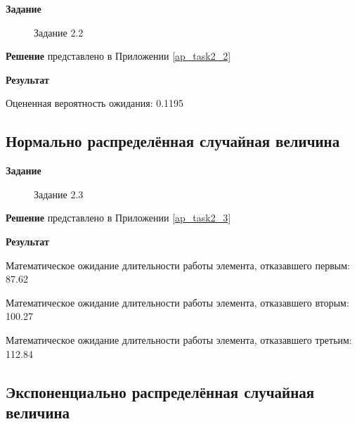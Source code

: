 \documentclass[otchet]{SCWorks}
\begin{document}
\textbf{Задание}

\begin{figure}[H]
	\caption{Задание 2.2}
	\label{pic4}
\end{figure}

\textbf{Решение} представлено в Приложении \ref{ap_task2_2}

\textbf{Результат} 

Оцененная вероятность ожидания: 0.1195

\subsection{Нормально распределённая случайная величина}

\textbf{Задание}

\begin{figure}[H]
	\caption{Задание 2.3}
	\label{pic5}
\end{figure}

\textbf{Решение} представлено в Приложении \ref{ap_task2_3}

\textbf{Результат}

Математическое ожидание длительности работы элемента, отказавшего первым: 87.62

Математическое ожидание длительности работы элемента, отказавшего вторым: 100.27

Математическое ожидание длительности работы элемента, отказавшего третьим: 112.84

\subsection{Экспоненциально распределённая случайная величина}
\end{document}
